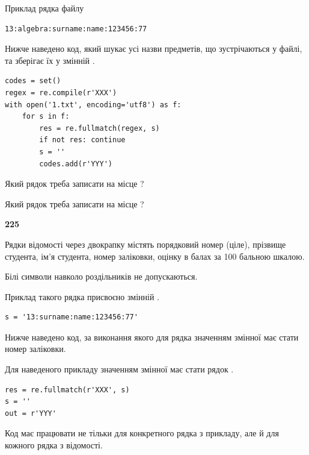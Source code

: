 Приклад рядка файлу



\begin{verbatim}
13:algebra:surname:name:123456:77
\end{verbatim}


Нижче наведено код, який шукає усі назви предметів, що зустрічаються у файлі, та зберігає їх у змінній .



\begin{verbatim}
codes = set()
regex = re.compile(r'XXX')
with open('1.txt', encoding='utf8') as f:
    for s in f:
        res = re.fullmatch(regex, s)
        if not res: continue
        s = ''
        codes.add(r'YYY')
\end{verbatim}





Який рядок треба записати на місце  ?\par
\vspace{5mm}


Який рядок треба записати на місце  ?\par


\newpage

{\begin {center}\textbf{ 225}\end {center}}\par
Рядки відомості через двокрапку містять порядковий номер (ціле), пріз\-ви\-ще студен\-та, ім'я студента, номер заліковки, оцінку в балах за 100 бальною шкалою.

Білі символи навколо роздільників не допускаються.

Приклад такого рядка присвоєно змінній .



\begin{verbatim}
s = '13:surname:name:123456:77'
\end{verbatim}


Нижче наведено код, за виконання якого для рядка  значенням змінної  має стати номер заліковки.

Для наведеного прикладу значенням змінної  має стати рядок  .



\begin{verbatim}
res = re.fullmatch(r'XXX', s)
s = ''
out = r'YYY'
\end{verbatim}


Код має працювати не тільки для конкретного рядка з прикладу, але й для кожного рядка з відомості.




